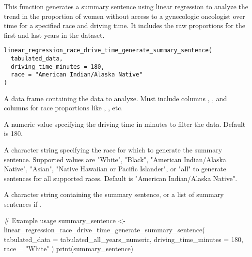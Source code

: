 \documentclass[a4paper]{book}
\begin{document}
%
\begin{Description}
This function generates a summary sentence using linear regression to analyze the trend in the proportion of women without access to a gynecologic oncologist over time for a specified race and driving time. It includes the raw proportions for the first and last years in the dataset.
\end{Description}
%
\begin{Usage}
\begin{verbatim}
linear_regression_race_drive_time_generate_summary_sentence(
  tabulated_data,
  driving_time_minutes = 180,
  race = "American Indian/Alaska Native"
)
\end{verbatim}
\end{Usage}
%
\begin{Arguments}
\begin{ldescription}
\item[\code{tabulated\_data}] A data frame containing the data to analyze. Must include columns , , and columns for race proportions like , , etc.

\item[\code{driving\_time\_minutes}] A numeric value specifying the driving time in minutes to filter the data. Default is 180.

\item[\code{race}] A character string specifying the race for which to generate the summary sentence. Supported values are "White", "Black", "American Indian/Alaska Native", "Asian", "Native Hawaiian or Pacific Islander", or "all" to generate sentences for all supported races. Default is "American Indian/Alaska Native".
\end{ldescription}
\end{Arguments}
%
\begin{Value}
A character string containing the summary sentence, or a list of summary sentences if .
\end{Value}
%
\begin{Examples}
\begin{ExampleCode}
# Example usage
summary_sentence <- linear_regression_race_drive_time_generate_summary_sentence(
  tabulated_data = tabulated_all_years_numeric,
  driving_time_minutes = 180,
  race = "White"
)
print(summary_sentence)
\end{ExampleCode}
\end{Examples}
\end{document}

